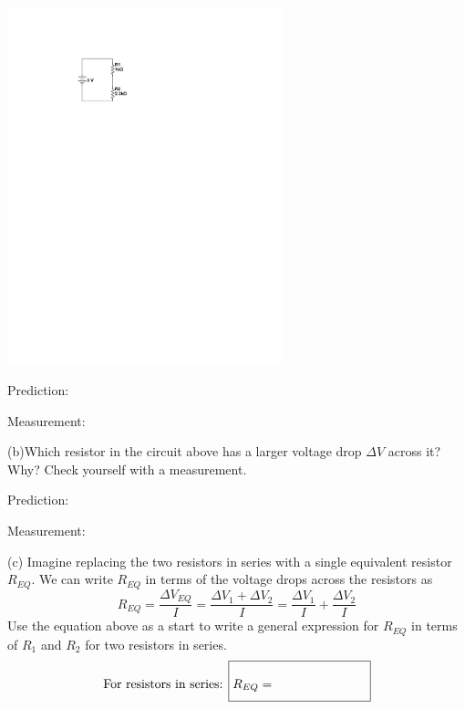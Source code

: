 \begin{minipage}{0.4\textwidth} 
\hspace{0.5in}\includegraphics[width=0.6\textwidth]{electric_circuits2/circ_diag4_bw.pdf}
\end{minipage}
\begin{minipage}{0.59\textwidth} 
\vspace{0.2 in}
Prediction: 
\vspace{0.4 in}

Measurement: \ 
\vspace{0.2 in}
\end{minipage}


(b)Which resistor in the circuit above has a larger voltage drop $\Delta V$ across it?   Why?  Check yourself with a measurement.  

\vspace{0.2 in}
\hspace{0.4 in} Prediction:
\vspace{0.2 in}

\hspace{0.4 in} Measurement:  
\vspace{0.2 in}

(c) Imagine replacing the two resistors in series with a single equivalent resistor $R_{EQ}$.  We can write $R_{EQ}$ in terms of the voltage drops across the resistors as
\begin{displaymath}
R_{EQ} = \frac{\Delta V_{EQ}}{I}= \frac{\Delta V_1 +\Delta V_2 }{I}=\frac{\Delta V_1}{I} + \frac{\Delta V_2}{I}
\end{displaymath}
Use the equation above as a start to write a general expression for $R_{EQ}$ in terms of $R_1$ and $R_2$ for two resistors in series.
\begin{displaymath}
\textrm{For resistors in series: } \boxed{R_{EQ} = \phantom{\rule[-0.1in]{1.0in}{.35in}}}
\end{displaymath}

